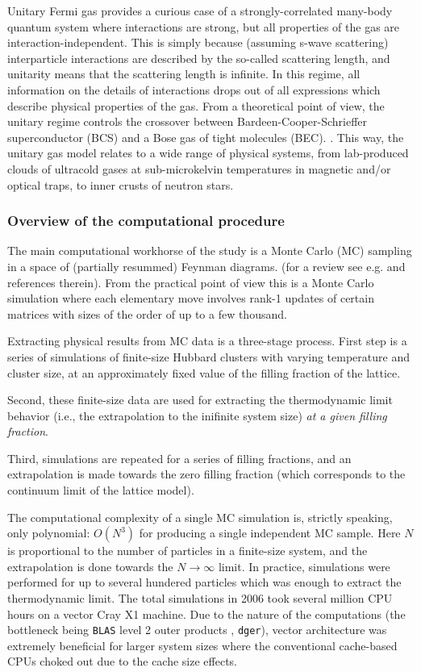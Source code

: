 
Unitary Fermi gas provides a curious case of a strongly-correlated many-body
quantum system where interactions are strong, but all properties of the gas are
interaction-independent. This is simply because (assuming s-wave scattering)
interparticle interactions are described by the so-called scattering length, 
and unitarity means that the scattering length is infinite. In this regime, all
information on the details of interactions drops out of all expressions which 
describe physical properties of the gas. From a theoretical point of view, the unitary regime controls
the crossover between Bardeen-Cooper-Schrieffer superconductor (BCS) and a Bose
gas of tight molecules (BEC). \cite{Eagles:1969, Legett:1980}. 
This way, the unitary gas model relates
to a wide range of physical systems, from lab-produced clouds of ultracold gases at
sub-microkelvin temperatures in magnetic and/or optical traps, to inner crusts of
neutron stars.

\subsubsection{Overview of the computational procedure}

The main computational workhorse of the study \cite{PRL:2006, NJP:2006} is a
Monte Carlo (MC) sampling in a space of (partially resummed) Feynman diagrams. 
(for a review see e.g. \cite{Gull:2011} and references therein). From the
practical point of view this is a Monte Carlo simulation where each elementary
move involves rank-1 updates of certain matrices with sizes of the order of up to
 a few thousand.

Extracting physical results from MC data is a three-stage process. First step is
a series of simulations of finite-size Hubbard clusters with varying temperature
and cluster size, at an approximately fixed value of the filling fraction of the lattice. 

Second, these finite-size data are used for extracting the thermodynamic limit behavior
(i.e., the extrapolation to the inifinite system size) \emph{at a given filling fraction}.

Third, simulations are repeated for a series of filling fractions, and an
extrapolation is made towards the zero filling fraction (which corresponds to 
the continuum limit of the lattice model).

The computational complexity of a single MC simulation is, strictly speaking,
only polynomial: $O(N^3)$ for producing a single independent MC sample. Here $N$ is
proportional to the number of particles in a finite-size system, and the extrapolation
is done towards the $N\to\infty$ limit. In practice, simulations were performed
for up to several hundered particles which was enough to extract the thermodynamic limit.
The total simulations in 2006 took several million CPU hours on a vector Cray X1 machine.
Due to the nature of the computations (the bottleneck being
\texttt{BLAS} level 2  outer products , \texttt{dger}), vector architecture was
extremely beneficial for larger system sizes where the conventional cache-based
CPUs choked out due to the cache size effects.


